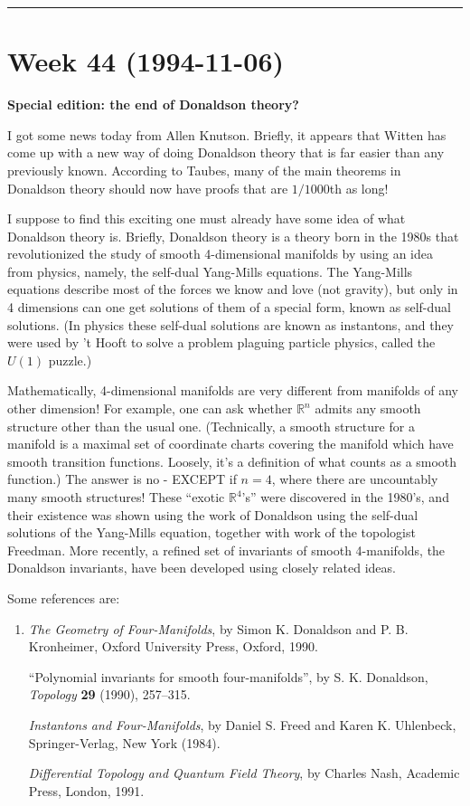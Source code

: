 \documentclass{article}
\begin{document}
\begin{center}\rule{0.5\linewidth}{0.5pt}\end{center}
\hypertarget{week-44-1994-11-06}{%
\section{Week 44 (1994-11-06)}\label{week-44-1994-11-06}}

\textbf{Special edition: the end of Donaldson theory?}

I got some news today from Allen Knutson. Briefly, it appears that
Witten has come up with a new way of doing Donaldson theory that is far
easier than any previously known. According to Taubes, many of the main
theorems in Donaldson theory should now have proofs that are
\(1/1000\)th as long!

I suppose to find this exciting one must already have some idea of what
Donaldson theory is. Briefly, Donaldson theory is a theory born in the
1980s that revolutionized the study of smooth 4-dimensional manifolds by
using an idea from physics, namely, the self-dual Yang-Mills equations.
The Yang-Mills equations describe most of the forces we know and love
(not gravity), but only in 4 dimensions can one get solutions of them of
a special form, known as self-dual solutions. (In physics these
self-dual solutions are known as instantons, and they were used by 't
Hooft to solve a problem plaguing particle physics, called the \(U(1)\)
puzzle.)

Mathematically, 4-dimensional manifolds are very different from
manifolds of any other dimension! For example, one can ask whether
\(\mathbb{R}^n\) admits any smooth structure other than the usual one.
(Technically, a smooth structure for a manifold is a maximal set of
coordinate charts covering the manifold which have smooth transition
functions. Loosely, it's a definition of what counts as a smooth
function.) The answer is no - EXCEPT if \(n = 4\), where there are
uncountably many smooth structures! These ``exotic \(\mathbb{R}^4\)'s''
were discovered in the 1980's, and their existence was shown using the
work of Donaldson using the self-dual solutions of the Yang-Mills
equation, together with work of the topologist Freedman. More recently,
a refined set of invariants of smooth 4-manifolds, the Donaldson
invariants, have been developed using closely related ideas.

Some references are:

\begin{enumerate}
\def\labelenumi{\arabic{enumi})}
\item
  \emph{The Geometry of Four-Manifolds}, by Simon K. Donaldson and P. B.
  Kronheimer, Oxford University Press, Oxford, 1990.

  ``Polynomial invariants for smooth four-manifolds'', by S. K.
  Donaldson, \emph{Topology} \textbf{29} (1990), 257--315.

  \emph{Instantons and Four-Manifolds}, by Daniel S. Freed and Karen K.
  Uhlenbeck, Springer-Verlag, New York (1984).

  \emph{Differential Topology and Quantum Field Theory}, by Charles
  Nash, Academic Press, London, 1991.
\end{enumerate}
\end{document}
